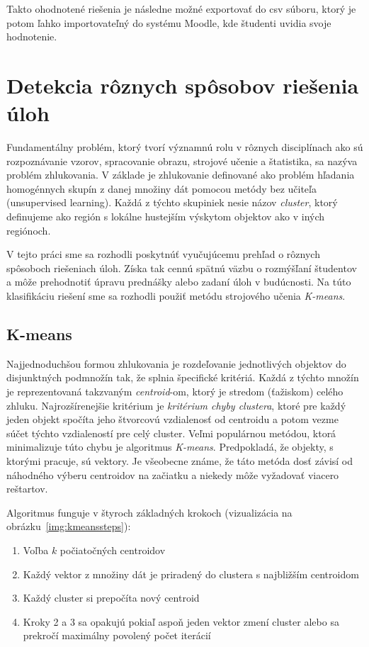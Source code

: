 Takto ohodnotené riešenia je následne možné exportovať do csv súboru, ktorý je
potom ľahko importovateľný do systému Moodle, kde študenti uvidia svoje hodnotenie.

\section{Detekcia rôznych spôsobov riešenia úloh}
\label{sec:solutionclusterizing}

Fundamentálny problém, ktorý tvorí významnú rolu v rôznych disciplínach ako sú
rozpoznávanie vzorov, spracovanie obrazu, strojové učenie a štatistika, sa nazýva problém
zhlukovania. V základe je zhlukovanie definované ako problém hľadania
homogénnych skupín z danej množiny dát pomocou metódy bez učiteľa (unsupervised
learning). Každá z týchto skupiniek nesie názov
\textit{cluster}, ktorý definujeme ako región s lokálne hustejším výskytom objektov ako
v iných regiónoch.

V tejto práci sme sa rozhodli poskytnúť vyučujúcemu prehľad o
rôznych spôsoboch riešeniach úloh. Získa tak cennú spätnú väzbu o rozmýšľaní študentov
a môže prehodnotiť úpravu prednášky alebo zadaní úloh v budúcnosti. Na túto klasifikáciu riešení
sme sa rozhodli použiť metódu strojového učenia \textit{K-means}.

\subsection{K-means}
\label{sec:solutionclusterizing:kmeans}

Najjednoduchšou formou zhlukovania je rozdeľovanie jednotlivých objektov do
disjunktných podmnožín tak, že splnia špecifické kritériá. Každá z týchto množín je reprezentovaná takzvaným \textit{centroid}-om, ktorý je stredom (ťažiskom) celého zhluku.
Najrozšírenejšie kritérium je \textit{kritérium chyby clustera}, ktoré pre každý
jeden objekt spočíta jeho štvorcovú vzdialenosť od centroidu a potom vezme
súčet týchto vzdialeností pre celý cluster. Veľmi populárnou metódou, ktorá minimalizuje
túto chybu je algoritmus \textit{K-means}. Predpokladá, že objekty, s ktorými pracuje,
sú vektory. Je všeobecne známe, že táto metóda dosť
závisí od náhodného výberu centroidov na začiatku a niekedy môže vyžadovať viacero
reštartov.~\cite{bib:globalkmeans}

Algoritmus funguje v štyroch základných krokoch (vizualizácia na
obrázku~\ref{img:kmeanssteps}):
\begin{enumerate}
	\item Voľba $k$ počiatočných centroidov
	\item Každý vektor z množiny dát je priradený do clustera s najbližším centroidom
	\item Každý cluster si prepočíta nový centroid
	\item Kroky 2 a 3 sa opakujú pokiaľ aspoň jeden vektor zmení cluster alebo
		sa prekročí maximálny povolený počet iterácií
\end{enumerate}

